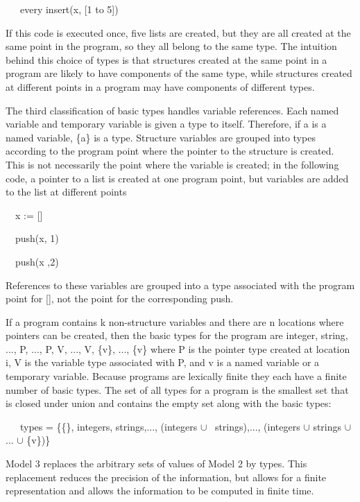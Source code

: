 {\ttfamily\mdseries
\ \ \ every insert(x, [1 to 5])}

If this code is executed once, five lists are created, but they are
all created at the same point in the program, so they all belong to
the same type. The intuition behind this choice of types is that
structures created at the same point in a program are likely to have
components of the same type, while structures created at different
points in a program may have components of different types.

The third classification of basic types handles variable
references. Each named variable and temporary variable is given a type
to itself. Therefore, if a is a named variable, \{a\} is a
type. Structure variables are grouped into types according to the
program point where the pointer to the structure is created. This is
not necessarily the point where the variable is created; in the
following code, a pointer to a list is created at one program point,
but variables are added to the list at different points

{\ttfamily\mdseries
\ \ x := []}

{\ttfamily\mdseries
\ \ push(x, 1)}

{\ttfamily\mdseries
\ \ push(x ,2)}

References to these variables are grouped into a type associated with
the program point for [], not the point for the corresponding push.

If a program contains k non-structure variables and there are n
locations where pointers can be created, then the basic types for the
program are integer, string, ..., P, ...,
P, V, ..., V,
\{v\}, ..., \{v\} where
P is the pointer type created at location i,
V is the variable type associated with
P, and v is a named variable or a
temporary variable. Because programs are lexically finite they each
have a finite number of basic types. The set of all types for a
program is the smallest set that is closed under union and contains
the empty set along with the basic types:


\ \ \ types = \{\{\}, integers, strings,..., (integers ${\cup}$ \ strings),..., (integers ${\cup}$ strings ${\cup}$ ...
${\cup}$ \{v\})\}

Model 3 replaces the arbitrary sets of values of Model 2 by
types. This replacement reduces the precision of the information, but
allows for a finite representation and allows the information to be
computed in finite time.

